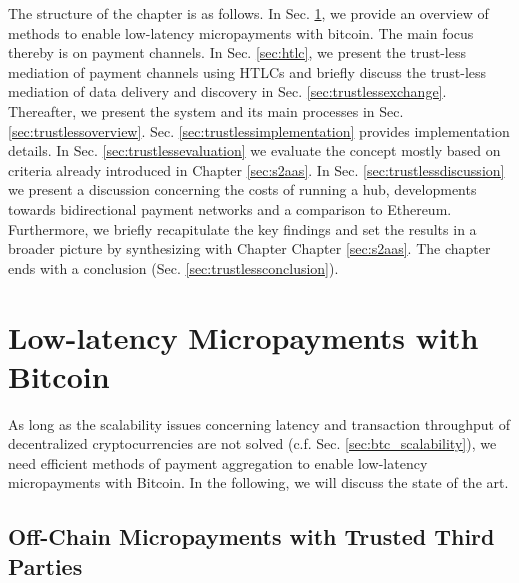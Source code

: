 The structure of the chapter is as follows. In Sec. \ref{sec:micropayments}, we provide an overview of methods to enable low-latency micropayments with bitcoin. The main focus thereby is on payment channels. In Sec. \ref{sec:htlc}, we present the trust-less mediation of payment channels using \ac{HTLC}s and briefly discuss the trust-less mediation of data delivery and discovery in Sec. \ref{sec:trustlessexchange}. Thereafter, we present the system and its main processes in Sec. \ref{sec:trustlessoverview}. Sec. \ref{sec:trustlessimplementation} provides implementation details. In Sec. \ref{sec:trustlessevaluation} we evaluate the concept mostly based on criteria already introduced in Chapter \ref{sec:s2aas}. In Sec. \ref{sec:trustlessdiscussion} we present a discussion concerning the costs of running a hub, developments towards bidirectional payment networks and a comparison to Ethereum. Furthermore, we briefly recapitulate the key findings and set the results in a broader picture by synthesizing with Chapter Chapter \ref{sec:s2aas}. The chapter ends with a conclusion (Sec. \ref{sec:trustlessconclusion}).


\section{Low-latency Micropayments with Bitcoin}
\label{sec:micropayments}

As long as the scalability issues concerning latency and transaction throughput of decentralized cryptocurrencies are not solved (c.f. Sec. \ref{sec:btc_scalability}), we need efficient methods of payment aggregation to enable low-latency micropayments with Bitcoin. In the following, we will discuss the state of the art. 


\subsection{Off-Chain Micropayments with Trusted Third Parties}

